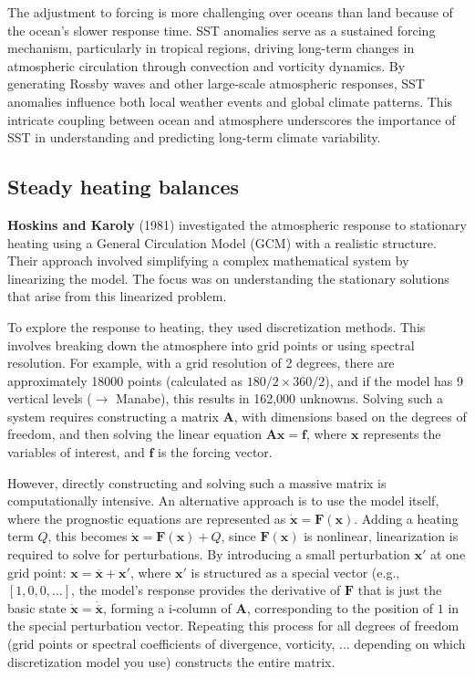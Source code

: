 The adjustment to forcing is more challenging over oceans than land because of the ocean’s slower response time. SST anomalies serve as a sustained forcing mechanism, particularly in tropical regions, driving long-term changes in atmospheric circulation through convection and vorticity dynamics. By generating Rossby waves and other large-scale atmospheric responses, SST anomalies influence both local weather events and global climate patterns. This intricate coupling between ocean and atmosphere underscores the importance of SST in understanding and predicting long-term climate variability.\\[0.25 cm]

\subsection{Steady heating balances}
\textbf{Hoskins and Karoly}\cite{Hos81} (1981) investigated the atmospheric response to stationary heating using a General Circulation Model (GCM) with a realistic structure. Their approach involved simplifying a complex mathematical system by linearizing the model. The focus was on understanding the stationary solutions that arise from this linearized problem.

To explore the response to heating, they used discretization methods. This involves breaking down the atmosphere into grid points or using spectral resolution. For example, with a grid resolution of 2 degrees, there are approximately 18000 points (calculated as $180/2×360/2$), and if the model has 9 vertical levels ($\rightarrow$ Manabe), this results in 162,000 unknowns. Solving such a system requires constructing a matrix $\mathbf{A}$, with dimensions based on the degrees of freedom, and then solving the linear equation $\mathbf{A}\mathbf{x}=\mathbf{f}$, where
$\mathbf{x}$ represents the variables of interest, and $\mathbf{f}$ is the forcing vector.

However, directly constructing and solving such a massive matrix is computationally intensive. An alternative approach is to use the model itself, where the prognostic equations are represented as $\mathbf{\dot{x}}=\mathbf{F(x)}$. Adding a heating term $Q$, this becomes $\mathbf{\dot{x}=F(x)}+Q$, since $\mathbf{F(x)}$ is nonlinear, linearization is required to solve for perturbations. By introducing a small perturbation $\mathbf{x'}$ at one grid point: $\mathbf{x=\overline{x}+x'}$, where $\mathbf{x'}$  is structured as a special vector (e.g., $[1,0,0,\dots]$, the model’s response provides the derivative of $\mathbf{F}$ that is just the basic state $\mathbf{\dot{x}=\dot{\overline{x}}}$, forming a i-column of $\mathbf{A}$, corresponding to the position of $1$ in the special perturbation vector. Repeating this process for all degrees of freedom (grid points or spectral coefficients of divergence, vorticity, ... depending on which discretization model you use) constructs the entire matrix.

